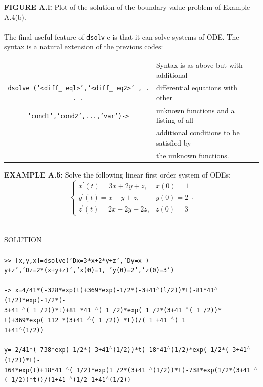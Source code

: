 \documentclass[../main.tex]{subfiles}
\begin{document}
\textbf{FIGURE A.l:} Plot of the solution of the boundary value problem of Example A.4(b).
\\
\\
The final useful feature of \texttt{dsolv} e is that it can solve systems of ODE. The 
syntax is a natural extension of the previous codes: 
\begin{center}
\begin{tabular}{|c|l|}
\hline
&Syntax is as above but with additional\\
\texttt{dsolve ('<diff\_ eql>','<diff\_ eq2>' , . . .}&differential equations with other\\
\texttt{'cond1','cond2',...,'var')->}&unknown functions and a listing of all\\
&additional conditions to be satisfied by\\
&the unknown functions.\\
\hline
\end{tabular}
\end{center}
\textbf{EXAMPLE A.5:} Solve the following linear first order system of ODEs: 
$$
\left\{\begin{array}{ll}
x^{\prime}(t)=3 x+2 y+z, & x(0)=1 \\
y^{\prime}(t)=x-y+z, & y(0)=2 \\
z^{\prime}(t)=2 x+2 y+2 z, & z(0)=3
\end{array} .\right.
$$
\\
\\
SOLUTION
\\
\\
\texttt{>> [x,y,x]=dsolve('Dx=3*x+2*y+z','Dy=x-)}\\
\texttt{y+z','Dz=2*(x+y+z)','x(0)=1, 'y(0)=2','z(0)=3') }\\
\\
\texttt{-> x=4/41*(-328*exp(t)+369*exp(-1/2*(-3+41$^{\wedge}$(l/2))*t)-81*41$^{\wedge}$(1/2)*exp(-1/2*(-}\\
\texttt{3+41 $^{\wedge}$( 1 /2))*t)+81 *41 $^{\wedge}$( 1 /2)*exp( 1 /2*(3+41 $^{\wedge}$( 1 /2))* t)+369*exp( 112 *(3+41 $^{\wedge}$( 1 /2)) *t))/( 1 +41 $^{\wedge}$( 1}\\
\texttt{1+41$^{\wedge}$(1/2))}\\
\\
\texttt{y=-2/41*(-738*exp(-1/2*(-3+41$^{\wedge}$(1/2))*t)-18*41$^{\wedge}$(1/2)*exp(-1/2*(-3+41$^{\wedge}$(1/2))*t)-}\\
\texttt{164*exp(t)+18*41 $^{\wedge}$( 1/2)*exp(1 /2*(3+41 $^{\wedge}$(1/2))*t)-738*exp(1/2*(3+41 $^{\wedge}$( 1/2))*t))/(1+41 $^{\wedge}$(1/2-1+41$^{\wedge}$(1/2)) }\\
\end{document}
